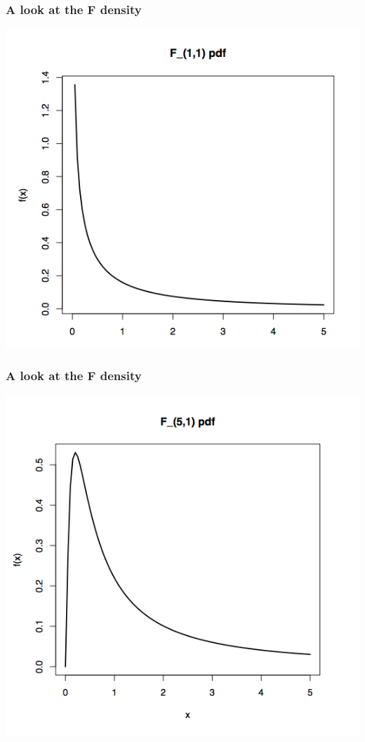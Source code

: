 \documentclass[handout]{beamer}\usepackage[]{graphicx}\usepackage[]{color}
\numberwithin{equation}{section}
\begin{document}
\begin{frame}
\frametitle{A look at the F density}
 \includegraphics{../../fig/fp1.png}
\end{frame}
\begin{frame}
\frametitle{A look at the F density}
 \includegraphics{../../fig/fp2.png}
\end{frame}
\end{document}

